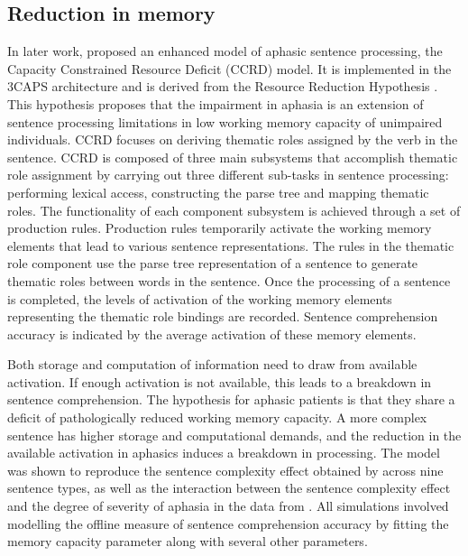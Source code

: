 \documentclass{cambridge7A}\usepackage[]{graphicx}\usepackage[]{color}
\begin{document}
\subsection{Reduction in memory}
In later work, 
\cite{Haarmann-EtAl-1997} proposed an enhanced model of aphasic sentence processing, the Capacity Constrained Resource Deficit (CCRD) model. It is implemented in the 3CAPS architecture  \cite{Just1980} and is derived from the Resource Reduction Hypothesis \cite{Miyake-EtAl-1994}. This hypothesis proposes that the impairment in aphasia is an extension of sentence processing limitations in low working memory capacity of unimpaired individuals. CCRD focuses on deriving thematic roles assigned by the verb in the sentence. CCRD is composed of three main subsystems that accomplish thematic role assignment by carrying out three different sub-tasks in sentence processing: performing lexical access, constructing the parse tree and mapping thematic roles. The functionality of each component subsystem is achieved through a set of production rules. Production rules temporarily activate the working memory elements that lead to various sentence representations. The rules in the thematic role component use the parse tree representation of a sentence to generate thematic roles between words in the sentence. Once the processing of a sentence is completed, the levels of activation of the working memory elements representing the thematic role bindings are recorded. Sentence comprehension accuracy is indicated by the average activation of these memory elements. 

Both storage and computation of information need to draw from available activation. If enough activation is not available, this leads to a breakdown in sentence comprehension. The hypothesis for aphasic patients is that they share a deficit of pathologically reduced working memory capacity. A more complex sentence has higher storage and computational demands, and the reduction in the available activation in aphasics induces a breakdown in processing. The model was shown to reproduce the sentence complexity effect obtained by \cite{Caplan-Et-Al-1985} across nine sentence types, as well as the interaction between the sentence complexity effect and the degree of severity of aphasia in the data from \cite{Kolk-vanGrunsven-1985}. All simulations involved modelling the offline measure of sentence comprehension accuracy by fitting the memory capacity parameter along with several other parameters.
\end{document}
